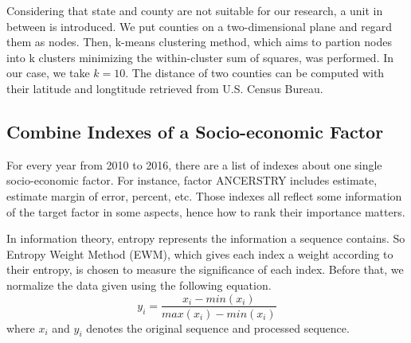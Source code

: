 \documentclass[12pt]{article}
\newcommand{\upcite}[1]{\textsuperscript{\textsuperscript{\cite{#1}}}}
\begin{document}

Considering that state and county are not suitable for our research, a unit in between is introduced. We put counties on a two-dimensional plane and regard them as nodes. Then, k-means clustering method\upcite{1}, which aims to partion nodes into k clusters minimizing the within-cluster sum of squares, was performed. In our case, we take $k = 10$. The distance of two counties can be computed with their latitude and longtitude retrieved from U.S. Census Bureau\upcite{2}. %

\subsection{Combine Indexes of a Socio-economic Factor}
For every year from 2010 to 2016, there are a list of indexes about one single socio-economic factor. For instance, factor ANCERSTRY includes estimate, estimate margin of error, percent, etc. Those indexes all reflect some information of the target factor in some aspects, hence how to rank their importance matters. 

In information theory, entropy represents the information a sequence contains\upcite{3}. So Entropy Weight Method (EWM), which gives each index a weight according to their entropy, is chosen to measure the significance of each index. Before that, we normalize the data given using the following equation.
\begin{equation}
	y_{i} = \frac{x_{i}-min(x_{i})}{max(x_{i}) - min(x_{i})}
\end{equation}
where $x_{i}$ and $y_{i}$ denotes the original sequence and processed sequence.
\end{document}

